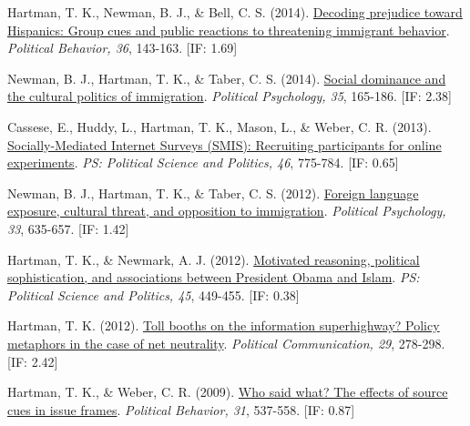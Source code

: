 \documentclass[12pt]{article}
\begin{document}
\begin{bibenum}
    \item {Hartman, T. K.}, Newman, B. J., \& Bell, C. S. (2014). 
          \href{https://10.1007/s11109-013-9231-7}
          {Decoding prejudice toward Hispanics: 
			Group cues and public reactions to threatening immigrant behavior}.
          \emph{Political Behavior, 36}, 143-163. [IF: 1.69]
  
    \item *Newman, B. J., {Hartman, T. K.}, \& Taber, C. S. (2014). 
          \href{https://10.1111/pops.12047}
          {Social dominance and the cultural politics of immigration}. 
          \emph{Political Psychology, 35}, 165-186. [IF: 2.38]

    \item Cassese, E., Huddy, L., {Hartman, T. K.}, Mason, L., 
          \& Weber, C. R. (2013). 
          \href{https://10.1017/S1049096513001029}
          {Socially-Mediated Internet Surveys (SMIS): 
          Recruiting participants for online experiments}. 
          \emph{PS: Political Science and Politics, 46}, 775-784. [IF: 0.65]

    \item Newman, B. J., {Hartman, T. K.}, \& Taber, C. S. (2012). 
          \href{https://10.1111/j.1467-9221.2012.00904.x}
          {Foreign language exposure, cultural threat, and opposition to immigration}. 
          \emph{Political Psychology, 33}, 635-657. [IF: 1.42]

    \item {Hartman, T. K.}, \& Newmark, A. J. (2012). 
          \href{https://10.1017/S1049096512000327}
          {Motivated reasoning, political sophistication, 
          and associations between President Obama and Islam}. 
          \emph{PS: Political Science and Politics, 45}, 449-455. [IF: 0.38]

    \item {Hartman, T. K.} (2012). 
          \href{https://10.1080/10584609.2012.694983}
          {Toll booths on the information superhighway? 
          Policy metaphors in the case of net neutrality}. 
          \emph{Political Communication, 29}, 278-298. [IF: 2.42]

    \item {Hartman, T. K.}, \& Weber, C. R. (2009). 
          \href{https://10.1007/s11109-009-9088-y}
          {Who said what? The effects of source cues in issue frames}. 
          \emph{Political Behavior, 31}, 537-558. [IF: 0.87]
          
\end{bibenum}
\end{document}
